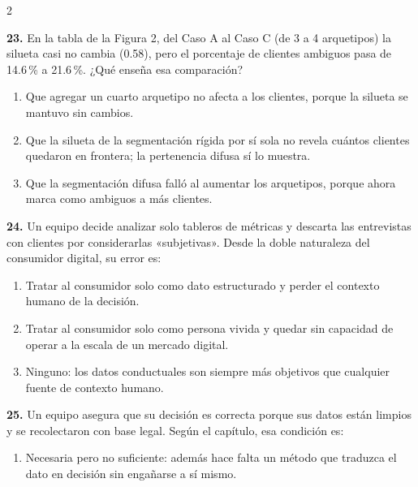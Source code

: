\documentclass[10pt,letterpaper]{article}
\begin{document}
\begin{multicols}{2}
\begin{enumerate}[label=\alph*),leftmargin=1.1em,itemsep=0pt,topsep=1pt,parsep=0pt,partopsep=0pt]
\end{enumerate}
\vspace{2pt}
\noindent\textbf{23.} En la tabla de la Figura 2, del Caso A al Caso C (de 3 a 4 arquetipos) la silueta casi no cambia (0.58), pero el porcentaje de clientes ambiguos pasa de 14.6\,\% a 21.6\,\%. ¿Qué enseña esa comparación?
\vspace{-3pt}
\begin{enumerate}[label=\alph*),leftmargin=1.1em,itemsep=0pt,topsep=1pt,parsep=0pt,partopsep=0pt]
\item Que agregar un cuarto arquetipo no afecta a los clientes, porque la silueta se mantuvo sin cambios.
\item Que la silueta de la segmentación rígida por sí sola no revela cuántos clientes quedaron en frontera; la pertenencia difusa sí lo muestra.
\item Que la segmentación difusa falló al aumentar los arquetipos, porque ahora marca como ambiguos a más clientes.
\end{enumerate}
\vspace{2pt}
\noindent\textbf{24.} Un equipo decide analizar solo tableros de métricas y descarta las entrevistas con clientes por considerarlas «subjetivas». Desde la doble naturaleza del consumidor digital, su error es:
\vspace{-3pt}
\begin{enumerate}[label=\alph*),leftmargin=1.1em,itemsep=0pt,topsep=1pt,parsep=0pt,partopsep=0pt]
\item Tratar al consumidor solo como dato estructurado y perder el contexto humano de la decisión.
\item Tratar al consumidor solo como persona vivida y quedar sin capacidad de operar a la escala de un mercado digital.
\item Ninguno: los datos conductuales son siempre más objetivos que cualquier fuente de contexto humano.
\end{enumerate}
\vspace{2pt}
\noindent\textbf{25.} Un equipo asegura que su decisión es correcta porque sus datos están limpios y se recolectaron con base legal. Según el capítulo, esa condición es:
\vspace{-3pt}
\begin{enumerate}[label=\alph*),leftmargin=1.1em,itemsep=0pt,topsep=1pt,parsep=0pt,partopsep=0pt]
\item Necesaria pero no suficiente: además hace falta un método que traduzca el dato en decisión sin engañarse a sí mismo.

\end{enumerate}
\end{multicols}
\end{document}
